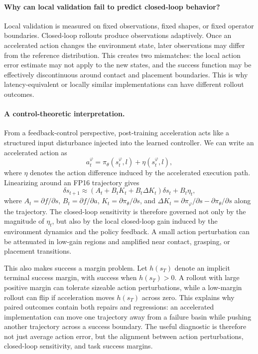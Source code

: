 \documentclass[10pt]{article}
\begin{document}
\paragraph{Why can local validation fail to predict closed-loop behavior?}
Local validation is measured on fixed observations, fixed shapes, or fixed operator boundaries. Closed-loop rollouts produce observations adaptively. Once an accelerated action changes the environment state, later observations may differ from the reference distribution. This creates two mismatches: the local action error estimate may not apply to the new states, and the success function may be effectively discontinuous around contact and placement boundaries. This is why latency-equivalent or locally similar implementations can have different rollout outcomes.

\paragraph{A control-theoretic interpretation.}
From a feedback-control perspective, post-training acceleration acts like a structured input disturbance injected into the learned controller. We can write an accelerated action as
\begin{equation}
    a_t^\varphi = \pi_\theta(s_t^\varphi,l) + \eta(s_t^\varphi,l),
\end{equation}
where $\eta$ denotes the action difference induced by the accelerated execution path. Linearizing around an FP16 trajectory gives
\begin{equation}
    \delta s_{t+1}
    \approx (A_t + B_tK_t + B_t\Delta K_t)\delta s_t + B_t\eta_t,
\end{equation}
where $A_t=\partial f/\partial s$, $B_t=\partial f/\partial a$, $K_t=\partial \pi_\theta/\partial s$, and $\Delta K_t=\partial\pi_\varphi/\partial s-\partial\pi_\theta/\partial s$ along the trajectory. The closed-loop sensitivity is therefore governed not only by the magnitude of $\eta_t$, but also by the local closed-loop gain induced by the environment dynamics and the policy feedback. A small action perturbation can be attenuated in low-gain regions and amplified near contact, grasping, or placement transitions.

This also makes success a margin problem. Let $h(s_T)$ denote an implicit terminal success margin, with success when $h(s_T)>0$. A rollout with large positive margin can tolerate sizeable action perturbations, while a low-margin rollout can flip if acceleration moves $h(s_T)$ across zero. This explains why paired outcomes contain both repairs and regressions: an accelerated implementation can move one trajectory away from a failure basin while pushing another trajectory across a success boundary. The useful diagnostic is therefore not just average action error, but the alignment between action perturbations, closed-loop sensitivity, and task success margins.
\end{document}
